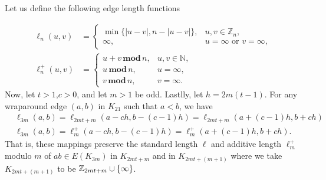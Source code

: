 \begin{thm}\label{thm:genwrapmap}
Let us define the following edge length functions

\begin{align*}
    \ell_{n}(u,v)&=
      \begin{cases}
        \min\{|u-v|,n-|u-v|\}, & u,v\in \mathbb{Z}_{n},\\
        \infty, & u=\infty\text{ or }v=\infty,
      \end{cases}\\
    \ell_{n}^{+}(u,v)&=
      \begin{cases}
        u+v\mathbf{\,mod\,}n, & u,v\in \mathbb{N},\\
        u\mathbf{\,mod\,}n,   & u=\infty,\\
        v\mathbf{\,mod\,}n,   & v=\infty.
      \end{cases}
    \end{align*}
\noindent Now, let $t>1$,$c>0$, and let $m>1$ be odd. Lastlly, let $h =2m(t-1)$. For any wraparound edge $(a,b)$ in $K_{21}$ such that $a<b$, we have
\begin{align}
&\ell_{3m}(a,b)=\ell_{2mt+m}(a-ch,b-(c-1)h)=\ell_{2mt+m}(a+(c-1)h,b+ch)\\
&\ell_{3m}(a,b)=\ell_{m}^{+}(a-ch,b-(c-1)h)=\ell_{m}^{+}(a+(c-1)h,b+ch).
\end{align}
That is, these mappings preserve the standard length $\ell$ and additive length $\ell_{m}^{+}$ modulo $m$ of $ab\in E(K_{3m})$ in $K_{2mt+m}$ and in $K_{2mt+(m+1)}$ where we take $K_{2mt+(m+1)}$ to be $\mathbb{Z}_{2mt+m}\cup \{\infty\}$.
\end{thm}

